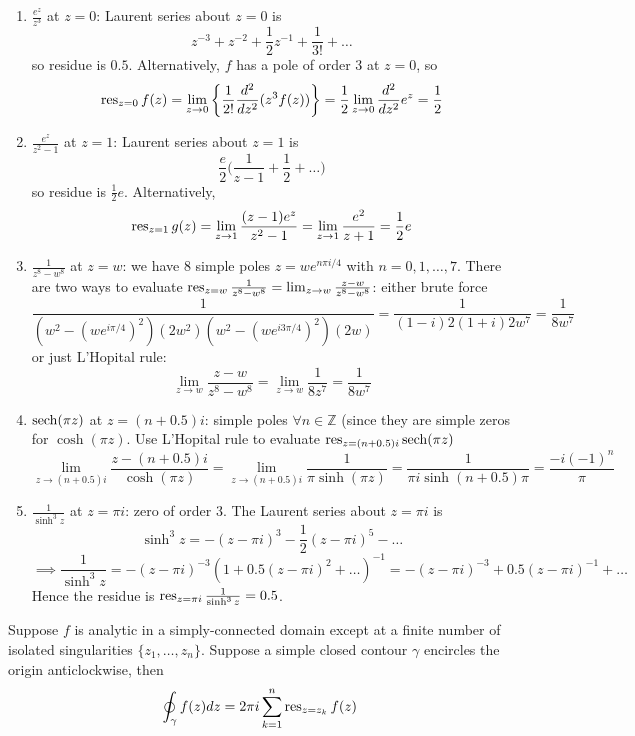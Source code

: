 \documentclass[a4paper]{article}
\begin{document}
\begin{eg}\leavevmode
\begin{enumerate}
    \item $\frac{e^z}{z^3}$ at $z=0$: Laurent series about $z=0$ is
    $$z^{-3}+z^{-2}+\frac{1}{2}z^{-1}+\frac{1}{3!}+\dots$$
    so residue is $0.5$. Alternatively, $f$ has a pole of order 3 at $z=0$, so
    $$\operatorname{res}_{z=0} f(z)=\lim_{z\rightarrow0}\bigg\{\frac{1}{2!}\frac{d^2}{dz^2}(z^3f(z))\bigg\}=\frac{1}{2}\lim_{z\rightarrow0}\frac{d^2}{dz^2}e^z=\frac{1}{2}$$
    \item $\frac{e^z}{z^2-1}$ at $z=1$: Laurent series about $z=1$ is
    $$\frac{e}{2}\bigg(\frac{1}{z-1}+\frac{1}{2}+\dots\bigg)$$
    so residue is $\frac{1}{2}e$. Alternatively,
    $$\operatorname{res}_{z=1}g(z)=\lim_{z\rightarrow1}\frac{(z-1)e^z}{z^2-1}=\lim_{z\rightarrow1}\frac{e^2}{z+1}=\frac{1}{2}e$$
    \item $\frac{1}{z^8-w^8}$ at $z=w$: we have 8 simple poles $z=we^{n\pi i/4}$ with $n=0,1,\dots,7$. There are two ways to evaluate $\operatorname{res}_{z=w}\frac{1}{z^8-w^8}=\lim_{z\rightarrow w}\frac{z-w}{z^8-w^8}$: either brute force
    $$\frac{1}{(w^2-(we^{i\pi/4})^2)(2w^2)(w^2-(we^{i3\pi/4})^2)(2w)}=\frac{1}{(1-i)2(1+i)2w^7}=\frac{1}{8w^7}$$
    or just L'Hopital rule:
    $$\lim_{z\rightarrow w}\frac{z-w}{z^8-w^8}=\lim_{z\rightarrow w}\frac{1}{8z^7}=\frac{1}{8w^7}$$
    \item $\operatorname{sech}(\pi z)$ at $z=(n+0.5)i$: simple poles $\forall n\in\mathbb{Z}$ (since they are simple zeros for $\cosh (\pi z)$. Use L'Hopital rule to evaluate 
    $\operatorname{res}_{z=(n+0.5)i}\operatorname{sech}(\pi z)$
    $$\lim_{z\rightarrow(n+0.5)i}\frac{z-(n+0.5)i}{\cosh(\pi z)}=\lim_{z\rightarrow(n+0.5)i}\frac{1}{\pi\sinh(\pi z)}=\frac{1}{\pi i\sinh(n+0.5)\pi}=\frac{-i(-1)^n}{\pi}$$
    \item $\frac{1}{\sinh^3z}$ at $z=\pi i$: zero of order 3. The Laurent series about $z=\pi i$ is 
    $$\sinh^3z=-(z-\pi i)^3-\frac{1}{2}(z-\pi i)^5-\dots$$
    $$\implies\frac{1}{\sinh^3z}=-(z-\pi i)^{-3}(1+0.5(z-\pi i)^2+\dots)^{-1}=-(z-\pi i)^{-3}+0.5(z-\pi i)^{-1}+\dots$$
    Hence the residue is $\operatorname{res}_{z=\pi i}\frac{1}{\sinh^3 z}=0.5$.
\end{enumerate}
\end{eg}
\begin{thm}
Suppose $f$ is analytic in a simply-connected domain except at a finite number of isolated singularities $\{z_1,\dots,z_n\}$. Suppose a simple closed contour $\gamma$ encircles the origin anticlockwise, then
$$\oint_\gamma f(z)dz=2\pi i\sum_{k=1}^n\operatorname{res}_{z=z_k}f(z)$$
\begin{center}
\end{center}
\end{thm}
\end{document}
